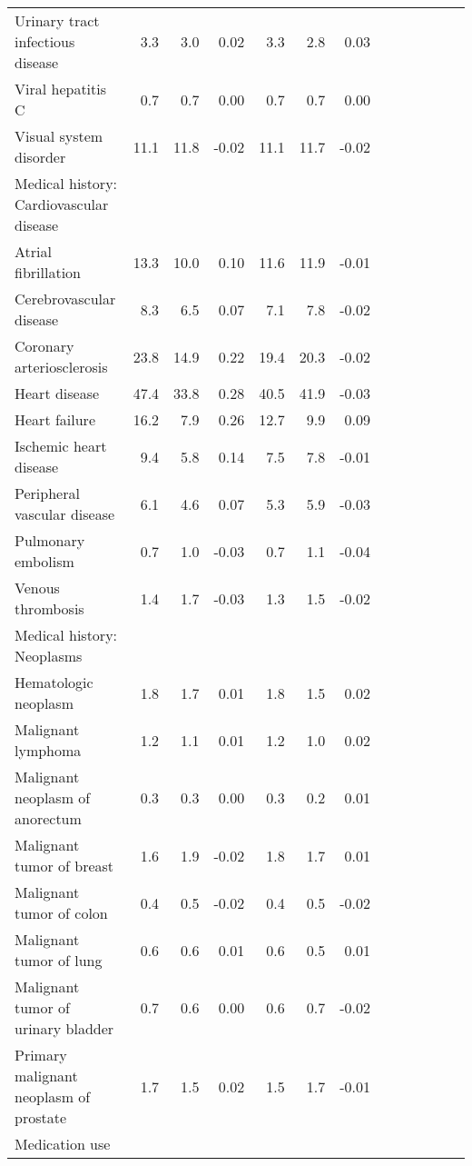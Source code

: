 \documentclass[11pt,]{article}
\begin{document}
\begin{longtable}{lrrrrrrrrrrrr}
      Urinary tract infectious disease &  3.3 &  3.0 &  0.02 &  3.3 &  2.8 &  0.03 \\ 
      Viral hepatitis C &  0.7 &  0.7 &  0.00 &  0.7 &  0.7 &  0.00 \\ 
      Visual system disorder & 11.1 & 11.8 & -0.02 & 11.1 & 11.7 & -0.02 \\ 
  Medical history: Cardiovascular disease &    &    &     &    &    &     \\ 
      Atrial fibrillation & 13.3 & 10.0 &  0.10 & 11.6 & 11.9 & -0.01 \\ 
      Cerebrovascular disease &  8.3 &  6.5 &  0.07 &  7.1 &  7.8 & -0.02 \\ 
      Coronary arteriosclerosis & 23.8 & 14.9 &  0.22 & 19.4 & 20.3 & -0.02 \\ 
      Heart disease & 47.4 & 33.8 &  0.28 & 40.5 & 41.9 & -0.03 \\ 
      Heart failure & 16.2 &  7.9 &  0.26 & 12.7 &  9.9 &  0.09 \\ 
      Ischemic heart disease &  9.4 &  5.8 &  0.14 &  7.5 &  7.8 & -0.01 \\ 
      Peripheral vascular disease &  6.1 &  4.6 &  0.07 &  5.3 &  5.9 & -0.03 \\ 
      Pulmonary embolism &  0.7 &  1.0 & -0.03 &  0.7 &  1.1 & -0.04 \\ 
      Venous thrombosis &  1.4 &  1.7 & -0.03 &  1.3 &  1.5 & -0.02 \\ 
  Medical history: Neoplasms &    &    &     &    &    &     \\ 
      Hematologic neoplasm &  1.8 &  1.7 &  0.01 &  1.8 &  1.5 &  0.02 \\ 
      Malignant lymphoma &  1.2 &  1.1 &  0.01 &  1.2 &  1.0 &  0.02 \\ 
      Malignant neoplasm of anorectum &  0.3 &  0.3 &  0.00 &  0.3 &  0.2 &  0.01 \\ 
      Malignant tumor of breast &  1.6 &  1.9 & -0.02 &  1.8 &  1.7 &  0.01 \\ 
      Malignant tumor of colon &  0.4 &  0.5 & -0.02 &  0.4 &  0.5 & -0.02 \\ 
      Malignant tumor of lung &  0.6 &  0.6 &  0.01 &  0.6 &  0.5 &  0.01 \\ 
      Malignant tumor of urinary bladder &  0.7 &  0.6 &  0.00 &  0.6 &  0.7 & -0.02 \\ 
      Primary malignant neoplasm of prostate &  1.7 &  1.5 &  0.02 &  1.5 &  1.7 & -0.01 \\ 
  Medication use &    &    &     &    &    &     \\ 

\end{longtable}
\end{document}
